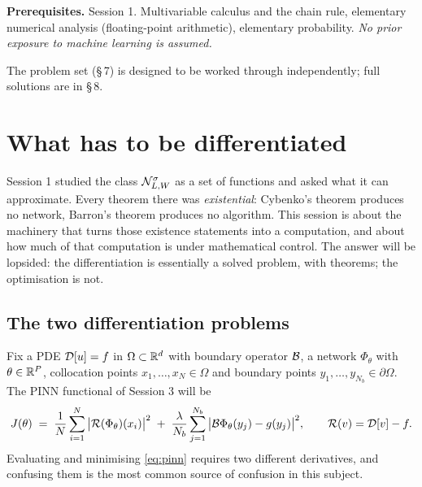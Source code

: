 \documentclass[11pt,a4paper]{article}
\begin{document}

\vspace{6pt}

\begin{keybox}
\textbf{Prerequisites.} Session 1. Multivariable calculus and the chain rule, elementary numerical
analysis (floating-point arithmetic), elementary probability. \emph{No prior exposure to machine
learning is assumed.}

\smallskip
The problem set (§\,7) is designed to be worked through independently; full solutions are in §\,8.
\end{keybox}

\newpage
\tableofcontents
\newpage

\section{What has to be differentiated}

Session 1 studied the class $\mathcal{N}^\sigma_{L,W}$ as a set of functions and asked what it can
approximate. Every theorem there was \emph{existential}: Cybenko's theorem produces no network,
Barron's theorem produces no algorithm. This session is about the machinery that turns those
existence statements into a computation, and about how much of that computation is under
mathematical control. The answer will be lopsided: the differentiation is essentially a solved
problem, with theorems; the optimisation is not.

\subsection{The two differentiation problems}

Fix a PDE $\mathcal{D}[u] = f$ in $\Omega \subset \mathbb{R}^d$ with boundary operator $\mathcal{B}$, a network
$\Phi_\theta$ with $\theta \in \mathbb{R}^P$, collocation points $x_1,\dots,x_N \in \Omega$ and boundary
points $y_1,\dots,y_{N_b} \in \partial\Omega$. The PINN functional of Session 3 will be
\begin{equation}\label{eq:pinn}
J(\theta) \;=\; \frac1N \sum_{i=1}^N \big| \mathcal{R}(\Phi_\theta)(x_i) \big|^2
\;+\; \frac{\lambda}{N_b} \sum_{j=1}^{N_b} \big| \mathcal{B}\Phi_\theta(y_j) - g(y_j) \big|^2,
\qquad \mathcal{R}(v) = \mathcal{D}[v] - f .
\end{equation}
Evaluating and minimising \eqref{eq:pinn} requires two different derivatives, and confusing them is
the most common source of confusion in this subject.
\end{document}
